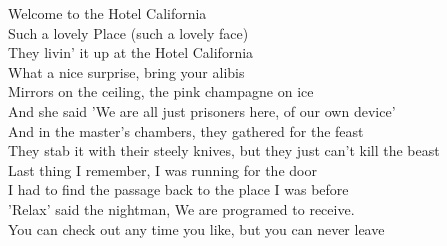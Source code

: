 \documentclass{novel}
\begin{document}
{{\begin{minipage}[b][0.55\textheight][t]{\textwidth}
\begin{multicols}{2}
Welcome to the Hotel California\\
Such a lovely Place (such a lovely face)\\
They livin' it up at the Hotel California\\
What a nice surprise, bring your alibis\\
Mirrors on the ceiling, the pink champagne on ice\\
And she said 'We are all just prisoners here, of our own device'\\
And in the master's chambers, they gathered for the feast\\
They stab it with their steely knives, but they just can't kill the beast\\
Last thing I remember, I was running for the door\\
I had to find the passage back to the place I was before\\
'Relax' said the nightman, We are programed to receive.\\
You can check out any time you like, but you can never leave\\

\end{multicols}
\end{minipage}
}
}

\newpage
\normalsize
\end{document}
